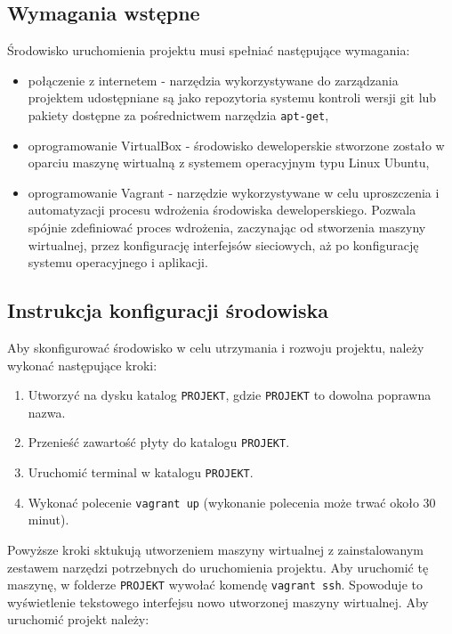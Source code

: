     \subsection{Wymagania wstępne}
    Środowisko uruchomienia projektu musi spełniać następujące wymagania:
    \begin{itemize}
        \item połączenie z internetem - narzędzia wykorzystywane do zarządzania projektem udostępniane są jako repozytoria systemu kontroli wersji git lub pakiety dostępne za pośrednictwem narzędzia \texttt{apt-get},
        \item oprogramowanie VirtualBox - środowisko deweloperskie stworzone zostało w oparciu maszynę wirtualną z systemem operacyjnym typu Linux Ubuntu,
        \item oprogramowanie Vagrant - narzędzie wykorzystywane w celu uproszczenia i automatyzacji procesu wdrożenia środowiska deweloperskiego. Pozwala spójnie zdefiniować proces wdrożenia, zaczynając od stworzenia maszyny wirtualnej, przez konfigurację interfejsów sieciowych, aż po konfigurację systemu operacyjnego i aplikacji.
    \end{itemize}

    \subsection{Instrukcja konfiguracji środowiska}
        Aby skonfigurować środowisko w celu utrzymania i rozwoju projektu, należy wykonać następujące kroki:
        \begin{enumerate}
            \item Utworzyć na dysku katalog \texttt{PROJEKT}, gdzie \texttt{PROJEKT} to dowolna poprawna nazwa.
            \item Przenieść zawartość płyty do katalogu \texttt{PROJEKT}.
            \item Uruchomić terminal w katalogu \texttt{PROJEKT}.
            \item Wykonać polecenie \texttt{vagrant up} (wykonanie polecenia może trwać około 30 minut).
        \end{enumerate}

        Powyższe kroki sktukują utworzeniem maszyny wirtualnej z zainstalowanym zestawem narzędzi potrzebnych do uruchomienia projektu. Aby uruchomić tę maszynę, w folderze \texttt{PROJEKT} wywołać komendę \texttt{vagrant ssh}. Spowoduje to wyświetlenie tekstowego interfejsu nowo utworzonej maszyny wirtualnej. Aby uruchomić projekt należy:

